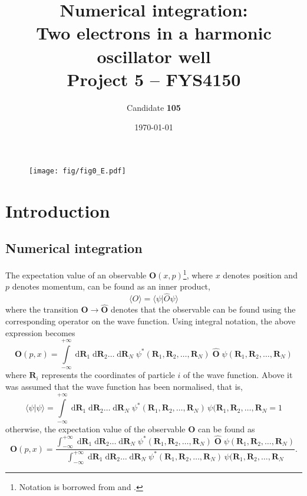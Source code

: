 \documentclass[a4paper,11pt]{article}
\date{\today}
\title{Numerical integration:\\ Two electrons in a harmonic oscillator well\\ \small{Project 5 -- FYS4150}}
\author{Candidate \textbf{105}}
\newcommand{\diff}{\ensuremath{\; \text{d}}}
\begin{document}
\onecolumn
\maketitle{}
\begin{figure}[htbp]
    \centering
    \texttt{[image: fig/fig0\_E.pdf]}
\end{figure}
\newpage

\begin{abstract}
\end{abstract}

\section{Introduction}

\subsection{Numerical integration}
The expectation value of an observable $\mathbf{O}(x,p)$\footnote{Notation is borrowed from \cite{Griffiths:2005} and \cite{MHJ:2013}.}, where $x$ denotes position and $p$ denotes momentum, can be found as an inner product,
\begin{equation}
    \langle O \rangle   =   \langle \psi | \hat{O} \psi \rangle
    \label{eq:observable}
\end{equation}
where the transition $\mathbf{O} \to \hat{\mathbf{O}}$ denotes that the observable can be found using the corresponding operator on the wave function. Using integral notation, the above expression becomes
\begin{equation}
    \mathbf{O}(p,x)   =   \int\limits_{-\infty}^{+\infty} \diff \mathbf{R}_1 \diff \mathbf{R}_2 \dots \diff \mathbf{R}_N \; \psi^*(\mathbf{R}_1, \mathbf{R}_2, \dots, \mathbf{R}_N ) \; \hat{\mathbf{O}} \; \psi(\mathbf{R}_1, \mathbf{R}_2, \dots, \mathbf{R}_N )
    \label{eq:observable_int1}
\end{equation}
where $\mathbf{R}_i$ represents the coordinates of particle $i$ of the wave function. Above it was assumed that the wave function has been normalised, that is,
\[ \langle \psi | \psi \rangle = \int\limits_{-\infty}^{+\infty}\! \diff \mathbf{R}_1 \diff \mathbf{R}_2 \dots \diff \mathbf{R}_N \; \psi^*(\mathbf{R}_1, \mathbf{R}_2, \dots, \mathbf{R}_N ) \, \psi(\mathbf{R}_1, \mathbf{R}_2, \dots, \mathbf{R}_N = 1 \]
otherwise, the expectation value of the observable $\mathbf{O}$ can be found as
\begin{equation}
    \mathbf{O}(p,x)   =   \frac{\int_{-\infty}^{+\infty} \diff \mathbf{R}_1 \diff \mathbf{R}_2 \dots \diff \mathbf{R}_N \; \psi^*(\mathbf{R}_1, \mathbf{R}_2, \dots, \mathbf{R}_N ) \; \hat{\mathbf{O}} \; \psi(\mathbf{R}_1, \mathbf{R}_2, \dots, \mathbf{R}_N ) }{ \int_{-\infty}^{+\infty} \diff \mathbf{R}_1 \diff \mathbf{R}_2 \dots \diff \mathbf{R}_N \; \psi^*(\mathbf{R}_1, \mathbf{R}_2, \dots, \mathbf{R}_N ) \, \psi(\mathbf{R}_1, \mathbf{R}_2, \dots, \mathbf{R}_N }.
    \label{eq:observable_final}
\end{equation}
\end{document}
